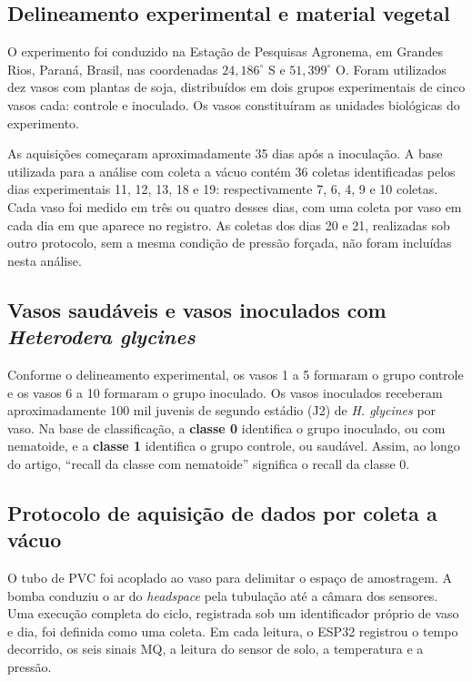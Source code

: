 \subsection{Delineamento experimental e material vegetal}
\label{subsec:delineamento}

O experimento foi conduzido na Estação de Pesquisas Agronema, em Grandes
Rios, Paraná, Brasil, nas coordenadas $24{,}186^{\circ}$ S e
$51{,}399^{\circ}$ O. Foram utilizados dez vasos com plantas de soja,
distribuídos em dois grupos experimentais de cinco vasos cada: controle e
inoculado. Os vasos constituíram as unidades biológicas do experimento.

As aquisições começaram aproximadamente 35 dias após a inoculação. A base
utilizada para a análise com coleta a vácuo contém 36 coletas identificadas
pelos dias experimentais 11, 12, 13, 18 e 19: respectivamente 7, 6, 4, 9 e
10 coletas. Cada vaso foi medido em três ou quatro desses dias, com uma
coleta por vaso em cada dia em que aparece no registro. As coletas dos dias
20 e 21, realizadas sob outro protocolo, sem a mesma condição de pressão
forçada, não foram incluídas nesta análise.



\subsection{Vasos saudáveis e vasos inoculados com \textit{Heterodera glycines}}
\label{subsec:classes_experimentais}

Conforme o delineamento experimental, os vasos 1 a 5 formaram o grupo
controle e os vasos 6 a 10 formaram o grupo inoculado. Os vasos inoculados
receberam aproximadamente 100 mil juvenis de segundo estádio (J2) de
\textit{H. glycines} por vaso. Na base de classificação, a \textbf{classe 0}
identifica o grupo inoculado, ou com nematoide, e a \textbf{classe 1}
identifica o grupo controle, ou saudável. Assim, ao longo do artigo,
``recall da classe com nematoide'' significa o recall da classe 0.

\subsection{Protocolo de aquisição de dados por coleta a vácuo}
\label{subsec:protocolo_aquisicao}

O tubo de PVC foi acoplado ao vaso para delimitar o espaço de amostragem.
A bomba conduziu o ar do \textit{headspace} pela tubulação até a câmara dos
sensores. Uma execução completa do ciclo, registrada sob um identificador
próprio de vaso e dia, foi definida como uma coleta. Em cada leitura, o
ESP32 registrou o tempo decorrido, os seis sinais MQ, a leitura do sensor de
solo, a temperatura e a pressão.

